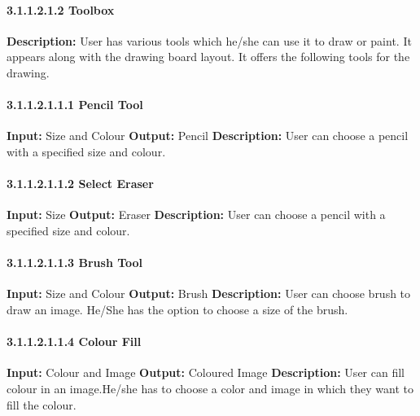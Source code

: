 \documentclass{scrreprt}
\begin{document}
\paragraph{3.1.1.2.1.2 Toolbox}
\hfill \vspace{2.5mm} \break 
\textbf{Description:} \newline
User has various tools which
he/she can use it to draw or paint. It appears along with the drawing board layout. It offers the following tools for the drawing.
\paragraph{3.1.1.2.1.1.1 Pencil Tool}
\hfill \vspace{2.5mm} \break 
\textbf{Input:} Size and Colour \newline
\textbf{Output:} Pencil
\vspace{1mm}\newline
\textbf{Description:} \newline 
User can choose a pencil with a specified size and colour.

\paragraph{3.1.1.2.1.1.2 Select Eraser}
\hfill \vspace{2.5mm} \break 
\textbf{Input:} Size \newline
\textbf{Output:} Eraser
\vspace{1mm}\newline
\textbf{Description:} \newline 
User can choose a pencil with a specified size and colour.

\paragraph{3.1.1.2.1.1.3 Brush Tool}
\hfill \vspace{2.5mm} \break 
\textbf{Input:} Size and Colour \newline
\textbf{Output:} Brush
\vspace{1mm}\newline
\textbf{Description:} \newline 
User can choose brush to draw an image. He/She has the option to choose a size of the brush.

\paragraph{3.1.1.2.1.1.4 Colour Fill}
\hfill \vspace{2.5mm} \break 
\textbf{Input:} Colour and Image \newline
\textbf{Output:} Coloured Image
\vspace{1mm}\newline
\textbf{Description:} \newline 
User can fill colour in an image.He/she has to choose a color and image in which they want to fill the colour.
\end{document}
